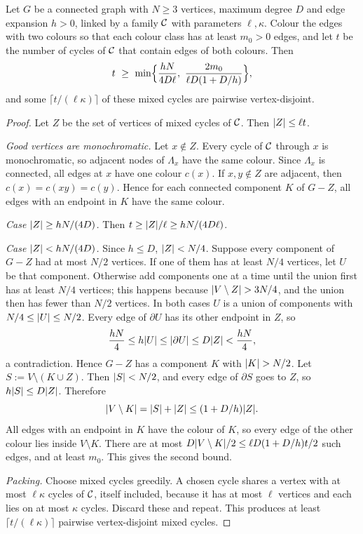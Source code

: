 \begin{lemma}\label{lem:mixed}
Let $G$ be a connected graph with $N\ge3$ vertices, maximum degree $D$ and edge expansion $h>0$, linked by a family $\mathcal{C}$ with parameters $\ell,\kappa$. Colour the edges with two colours so that each colour class has at least $m_0>0$ edges, and let $t$ be the number of cycles of $\mathcal{C}$ that contain edges of both colours. Then
\[
  t\ \ge\ \min\Bigl\{\frac{hN}{4D\ell},\ \frac{2m_0}{\ell D(1+D/h)}\Bigr\},
\]
and some $\lceil t/(\ell\kappa)\rceil$ of these mixed cycles are pairwise vertex-disjoint.
\end{lemma}

\begin{proof}
Let $Z$ be the set of vertices of mixed cycles of $\mathcal{C}$. Then $\lvert Z\rvert\le\ell t$.

\emph{Good vertices are monochromatic.} Let $x\notin Z$. Every cycle of $\mathcal{C}$ through $x$ is monochromatic, so adjacent nodes of $\Lambda_x$ have the same colour. Since $\Lambda_x$ is connected, all edges at $x$ have one colour $c(x)$. If $x,y\notin Z$ are adjacent, then $c(x)=c(xy)=c(y)$. Hence for each connected component $K$ of $G-Z$, all edges with an endpoint in $K$ have the same colour.

\emph{Case $\lvert Z\rvert\ge hN/(4D)$.} Then $t\ge\lvert Z\rvert/\ell\ge hN/(4D\ell)$.

\emph{Case $\lvert Z\rvert<hN/(4D)$.} Since $h\le D$, $\lvert Z\rvert<N/4$. Suppose every component of $G-Z$ had at most $N/2$ vertices. If one of them has at least $N/4$ vertices, let $U$ be that component. Otherwise add components one at a time until the union first has at least $N/4$ vertices; this happens because $\lvert V\setminus Z\rvert>3N/4$, and the union then has fewer than $N/2$ vertices. In both cases $U$ is a union of components with $N/4\le\lvert U\rvert\le N/2$. Every edge of $\partial U$ has its other endpoint in $Z$, so
\[
  \frac{hN}4\le h\lvert U\rvert\le\lvert \partial U\rvert\le D\lvert Z\rvert<\frac{hN}4,
\]
a contradiction. Hence $G-Z$ has a component $K$ with $\lvert K\rvert>N/2$. Let $S:=V\setminus(K\cup Z)$. Then $\lvert S\rvert<N/2$, and every edge of $\partial S$ goes to $Z$, so $h\lvert S\rvert\le D\lvert Z\rvert$. Therefore
\[
  \lvert V\setminus K\rvert=\lvert S\rvert+\lvert Z\rvert\le(1+D/h)\lvert Z\rvert .
\]
All edges with an endpoint in $K$ have the colour of $K$, so every edge of the other colour lies inside $V\setminus K$. There are at most $D\lvert V\setminus K\rvert/2\le\ell D(1+D/h)t/2$ such edges, and at least $m_0$. This gives the second bound.

\emph{Packing.} Choose mixed cycles greedily. A chosen cycle shares a vertex with at most $\ell\kappa$ cycles of $\mathcal{C}$, itself included, because it has at most $\ell$ vertices and each lies on at most $\kappa$ cycles. Discard these and repeat. This produces at least $\lceil t/(\ell\kappa)\rceil$ pairwise vertex-disjoint mixed cycles.
\end{proof}

